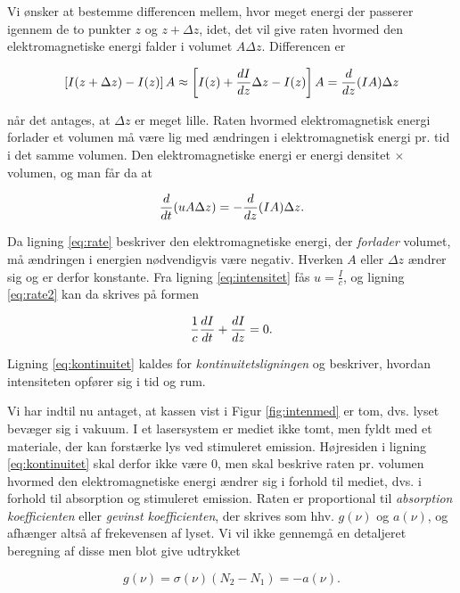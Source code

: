 Vi ønsker at bestemme differencen mellem, hvor meget energi der passerer igennem de to punkter $z$ og $z+\Delta z$, idet, det vil give raten hvormed den elektromagnetiske energi falder i volumet $A\Delta z$. Differencen er 

\begin{equation}
\left[I(z+\Delta z)-I(z)\right]A \approx \left[ I(z) + {d{I} \over d{z}}\Delta z - I(z) \right]A = {d{} \over d{z}}(IA)\Delta z
\label{eq:rate}
\end{equation}

når det antages, at $\Delta z$ er meget lille. Raten hvormed elektromagnetisk energi forlader et volumen må være lig med ændringen i elektromagnetisk energi pr. tid i det samme volumen. Den elektromagnetiske energi er energi densitet $\times$ volumen, og man får da at 

\begin{equation}
{d{} \over d{t}}(uA\Delta z) = -{d{} \over d{z}}(IA)\Delta z. 
\label{eq:rate2}
\end{equation}

Da ligning \ref{eq:rate} beskriver den elektromagnetiske energi, der \emph{forlader} volumet, må ændringen i energien nødvendigvis være negativ. Hverken $A$ eller $\Delta z$ ændrer sig og er derfor konstante. Fra ligning \ref{eq:intensitet} fås $u=\frac{I}{c}$, og ligning \ref{eq:rate2} kan da skrives på formen

\begin{equation}
\frac{1}{c}{d{I} \over d{t}} + {d{I} \over d{z}} = 0.
\label{eq:kontinuitet}
\end{equation} 

Ligning \ref{eq:kontinuitet} kaldes for \emph{kontinuitetsligningen} og beskriver, hvordan intensiteten opfører sig i tid og rum. 

Vi har indtil nu antaget, at kassen vist i Figur \ref{fig:intenmed} er tom, dvs. lyset bevæger sig i vakuum. I et lasersystem er mediet ikke tomt, men fyldt med et materiale, der kan forstærke lys ved stimuleret emission. Højresiden i ligning \ref{eq:kontinuitet} skal derfor ikke være 0, men skal beskrive raten pr. volumen hvormed den elektromagnetiske energi ændrer sig i forhold til mediet, dvs. i forhold til absorption og stimuleret emission. Raten er proportional til \emph{absorption koefficienten} eller \emph{gevinst koefficienten}, der skrives som hhv. $g(\nu)$ og $a(\nu)$, og afhænger altså af frekevensen af lyset. Vi vil ikke gennemgå en detaljeret beregning af disse men blot give udtrykket 

\begin{equation}
g(\nu) = \sigma(\nu)(N_2-N_1) = -a(\nu). 
\label{eq:gevinst}
\end{equation}

